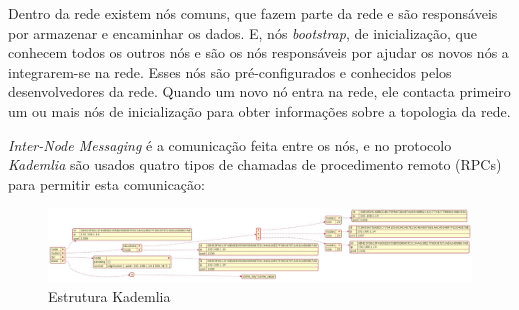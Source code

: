 \documentclass[conference]{IEEEtran}
\begin{document}
    Dentro da rede existem nós comuns, que fazem parte da rede e são responsáveis por armazenar e encaminhar os dados. E, nós \textit{bootstrap}, de inicialização, que conhecem todos os outros nós e são os nós responsáveis por ajudar os novos nós a integrarem-se na rede. Esses nós são pré-configurados e conhecidos pelos desenvolvedores da rede. Quando um novo nó entra na rede, ele contacta primeiro um ou mais nós de inicialização para obter informações sobre a topologia da rede.

    \textit{Inter-Node Messaging} é a comunicação feita entre os nós, e no protocolo \textit{Kademlia} são usados quatro tipos de chamadas de procedimento remoto (RPCs) para permitir esta comunicação:

    \begin{figure}[b]
        \centering
        \includegraphics[width=\textwidth]{images/kademlia-estrutura.jpeg}
        \caption{Estrutura Kademlia \cite{1}}
        \label{fig:Estrutura Kademlia}
    \end{figure}
\end{document}
